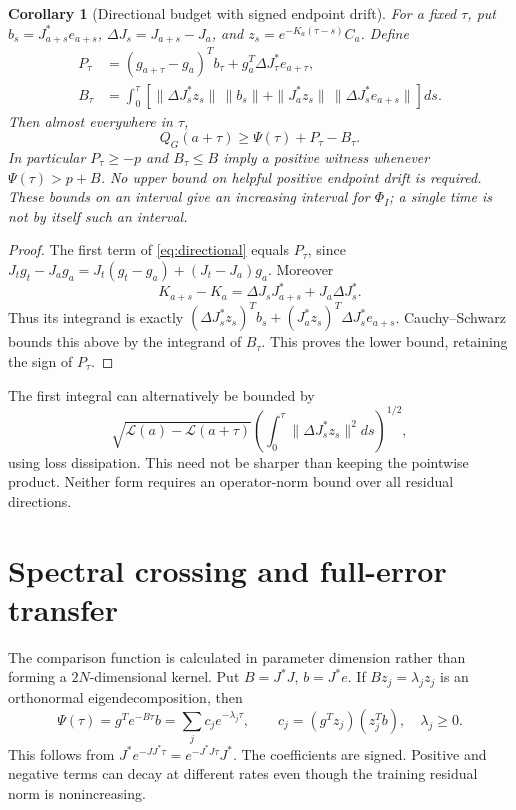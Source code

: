 \documentclass[10pt]{article}
\newtheorem{corollary}[theorem]{Corollary}
\begin{document}
\begin{corollary}[Directional budget with signed endpoint drift]\label{cor:directional}
For a fixed $\tau$, put $b_s=J_{a+s}^*e_{a+s}$,
$\Delta J_s=J_{a+s}-J_a$, and $z_s=e^{-K_a(\tau-s)}C_a$. Define
\begin{align*}
 P_\tau&=(g_{a+\tau}-g_a)^Tb_\tau
                  +g_a^T\Delta J_\tau^*e_{a+\tau},\\
 B_\tau&=\int_0^\tau\left[
       \|\Delta J_s^*z_s\|\,\|b_s\|
       +\|J_a^*z_s\|\,\|\Delta J_s^*e_{a+s}\|\right]ds.
\end{align*}
Then almost everywhere in $\tau$,
\begin{equation}\label{eq:directional-budget}
 Q_G(a+\tau)\ge\Psi(\tau)+P_\tau-B_\tau.
\end{equation}
In particular $P_\tau\ge-p$ and $B_\tau\le B$ imply a positive witness
whenever $\Psi(\tau)>p+B$. No upper bound on helpful positive endpoint
drift is required. These bounds on an interval give an increasing interval
for $\Phi_I$; a single time is not by itself such an interval.
\end{corollary}
\begin{proof}
The first term of \eqref{eq:directional} equals $P_\tau$, since
$J_tg_t-J_ag_a=J_t(g_t-g_a)+(J_t-J_a)g_a$. Moreover
\[
 K_{a+s}-K_a=\Delta J_sJ_{a+s}^*+J_a\Delta J_s^*.
\]
Thus its integrand is exactly
$(\Delta J_s^*z_s)^Tb_s+(J_a^*z_s)^T\Delta J_s^*e_{a+s}$.
Cauchy--Schwarz bounds this above by the integrand of $B_\tau$.
This proves the lower bound, retaining the sign of $P_\tau$.
\end{proof}
The first integral can alternatively be bounded by
\[
 \sqrt{\mathcal L(a)-\mathcal L(a+\tau)}
       \left(\int_0^\tau\|\Delta J_s^*z_s\|^2ds\right)^{1/2},
\]
using loss dissipation. This need not be sharper than keeping the pointwise
product. Neither form requires an operator-norm bound over all residual
directions.

\section{Spectral crossing and full-error transfer}
The comparison function is calculated in parameter dimension rather than
forming a $2N$-dimensional kernel. Put $B=J^*J$, $b=J^*e$. If
$Bz_j=\lambda_jz_j$ is an orthonormal eigendecomposition, then
\begin{equation}\label{eq:spectrum}
 \Psi(\tau)=g^Te^{-B\tau}b
     =\sum_j c_je^{-\lambda_j\tau},\qquad
 c_j=(g^Tz_j)(z_j^Tb),\quad \lambda_j\ge0.
\end{equation}
This follows from $J^*e^{-JJ^*\tau}=e^{-J^*J\tau}J^*$. The coefficients
are signed. Positive and negative terms can decay at different rates even
though the training residual norm is nonincreasing.
\end{document}
